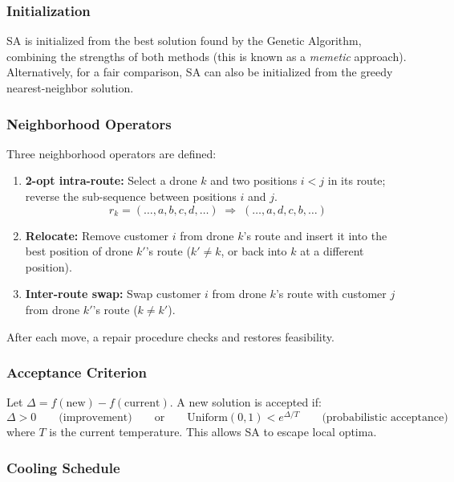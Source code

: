 \documentclass[12pt,a4paper]{article}
\begin{document}
\subsubsection{Initialization}

SA is initialized from the best solution found by the Genetic Algorithm, combining
the strengths of both methods (this is known as a \emph{memetic} approach).
Alternatively, for a fair comparison, SA can also be initialized from the greedy
nearest-neighbor solution.

\subsubsection{Neighborhood Operators}

Three neighborhood operators are defined:

\begin{enumerate}
  \item \textbf{2-opt intra-route:} Select a drone $k$ and two positions $i < j$ in
  its route; reverse the sub-sequence between positions $i$ and $j$.
  \[
    r_k = (\ldots, a, b, c, d, \ldots) \;\Rightarrow\; (\ldots, a, d, c, b, \ldots)
  \]

  \item \textbf{Relocate:} Remove customer $i$ from drone $k$'s route and insert it
  into the best position of drone $k'$'s route ($k' \neq k$, or back into $k$ at a
  different position).

  \item \textbf{Inter-route swap:} Swap customer $i$ from drone $k$'s route with
  customer $j$ from drone $k'$'s route ($k \neq k'$).
\end{enumerate}

After each move, a repair procedure checks and restores feasibility.

\subsubsection{Acceptance Criterion}

Let $\Delta = f(\text{new}) - f(\text{current})$. A new solution is accepted if:
\[
  \Delta > 0 \qquad \text{(improvement)} \qquad \text{or} \qquad
  \text{Uniform}(0,1) < e^{\Delta / T} \qquad \text{(probabilistic acceptance)}
\]
where $T$ is the current temperature. This allows SA to escape local optima.

\subsubsection{Cooling Schedule}
\end{document}
